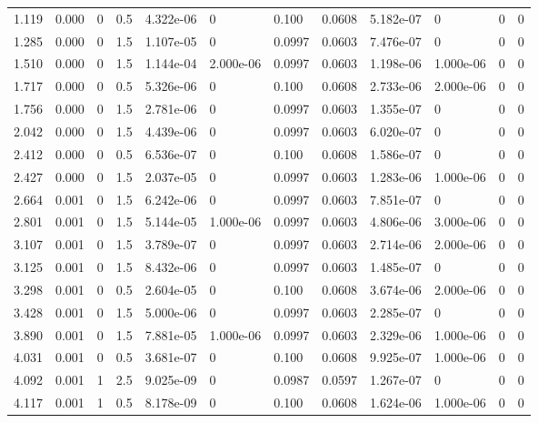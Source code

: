 \documentclass[preview]{standalone}
\begin{document}
{{\begin{tabular}{L{1.2cm}C{1.2cm} C{0.3cm}C{0.5cm} C{1.4cm}C{1.4cm} C{1.4cm}C{1.4cm} C{1.6cm}C{1.6cm} C{1.6cm}C{1.6cm}}
  1.119  &  0.000  & 0     & 0.5 &  4.322e-06  & 0  &  0.100&   0.0608& 5.182e-07 & 0   &  0 & 0  \\ 
  1.285  &  0.000  & 0     & 1.5 &  1.107e-05  & 0  &  0.0997&   0.0603& 7.476e-07 & 0   &  0 & 0  \\ 
  1.510  &  0.000  & 0     & 1.5 &  1.144e-04  & 2.000e-06  &  0.0997&   0.0603& 1.198e-06 & 1.000e-06   &  0 & 0  \\ 
  1.717  &  0.000  & 0     & 0.5 &  5.326e-06  & 0  &  0.100&   0.0608& 2.733e-06 & 2.000e-06   &  0 & 0  \\ 
  1.756  &  0.000  & 0     & 1.5 &  2.781e-06  & 0  &  0.0997&   0.0603& 1.355e-07 & 0   &  0 & 0  \\ 
  2.042  &  0.000  & 0     & 1.5 &  4.439e-06  & 0  &  0.0997&   0.0603& 6.020e-07 & 0   &  0 & 0  \\ 
  2.412  &  0.000  & 0     & 0.5 &  6.536e-07  & 0  &  0.100&   0.0608& 1.586e-07 & 0   &  0 & 0  \\ 
  2.427  &  0.000  & 0     & 1.5 &  2.037e-05  & 0  &  0.0997&   0.0603& 1.283e-06 & 1.000e-06   &  0 & 0  \\ 
  2.664  &  0.001  & 0     & 1.5 &  6.242e-06  & 0  &  0.0997&   0.0603& 7.851e-07 & 0   &  0 & 0  \\ 
  2.801  &  0.001  & 0     & 1.5 &  5.144e-05  & 1.000e-06  &  0.0997&   0.0603& 4.806e-06 & 3.000e-06   &  0 & 0  \\ 
  3.107  &  0.001  & 0     & 1.5 &  3.789e-07  & 0  &  0.0997&   0.0603& 2.714e-06 & 2.000e-06   &  0 & 0  \\ 
  3.125  &  0.001  & 0     & 1.5 &  8.432e-06  & 0  &  0.0997&   0.0603& 1.485e-07 & 0   &  0 & 0  \\ 
  3.298  &  0.001  & 0     & 0.5 &  2.604e-05  & 0  &  0.100&   0.0608& 3.674e-06 & 2.000e-06   &  0 & 0  \\ 
  3.428  &  0.001  & 0     & 1.5 &  5.000e-06  & 0  &  0.0997&   0.0603& 2.285e-07 & 0   &  0 & 0  \\ 
  3.890  &  0.001  & 0     & 1.5 &  7.881e-05  & 1.000e-06  &  0.0997&   0.0603& 2.329e-06 & 1.000e-06   &  0 & 0  \\ 
  4.031  &  0.001  & 0     & 0.5 &  3.681e-07  & 0  &  0.100&   0.0608& 9.925e-07 & 1.000e-06   &  0 & 0  \\ 
  4.092  &  0.001  & 1     & 2.5 &  9.025e-09  & 0  &  0.0987&   0.0597& 1.267e-07 & 0   &  0 & 0  \\ 
  4.117  &  0.001  & 1     & 0.5 &  8.178e-09  & 0  &  0.100&   0.0608& 1.624e-06 & 1.000e-06   &  0 & 0  \\ 

\end{tabular}}}
\end{document}
